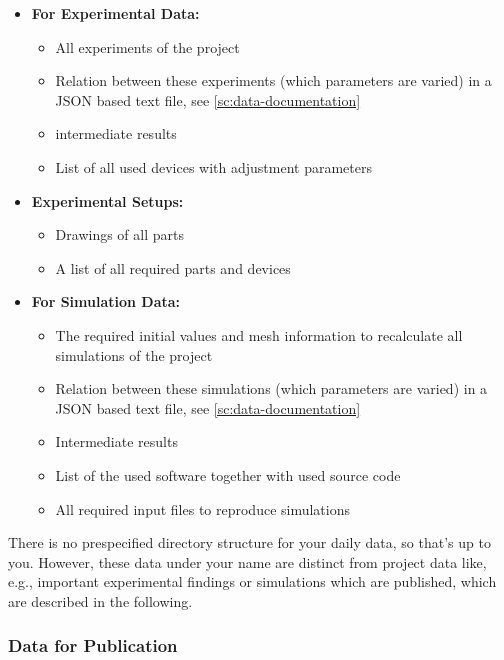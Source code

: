 \begin{itemize}
  \item[$\rightarrow$] \textbf{For Experimental Data:}
    \begin{itemize}
      \item All experiments of the project
      \item Relation between these experiments (which parameters are varied) in
            a JSON based text file, see \autoref{sc:data-documentation}
      \item intermediate results
      \item List of all used devices with adjustment parameters
    \end{itemize}
  \item[$\rightarrow$] \textbf{Experimental Setups:}
    \begin{itemize}
      \item Drawings of all parts
      \item A list of all required parts and devices
    \end{itemize}
  \item[$\rightarrow$] \textbf{For Simulation Data:}
    \begin{itemize}
      \item The required initial values and mesh information to recalculate all
            simulations of the project
      \item Relation between these simulations (which parameters are varied) in
            a JSON based text file, see \autoref{sc:data-documentation}
      \item Intermediate results
      \item List of the used software together with used source code
      \item All required input files to reproduce simulations
    \end{itemize}
\end{itemize}

\noindent There is no prespecified directory structure for your daily data, so
that’s up to you. However, these data under your name are distinct from project
data like, e.g., important experimental findings or simulations which are
published, which are described in the following.

\subsubsection{Data for Publication}\label{ssc:data-for-publication}

